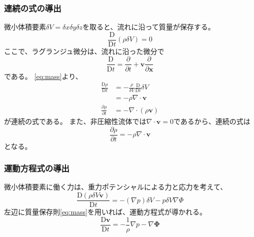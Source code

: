 \documentclass{jsarticle}
\newcommand{\bx}{\mathbf{x}}
\newcommand{\bv}{\mathbf{v}}
\newcommand{\pder}[2][]{\frac{\partial#1}{\partial#2}}
\newcommand{\Dder}[2][]{\frac{\mathrm{D}#1}{\mathrm{D}#2}}
\begin{document}
\subsubsection{連続の式の導出}
微小体積要素$\delta V = \delta x \delta y \delta z$を取ると、流れに沿って質量が保存する。
\begin{equation}
    \Dder[]{t} (\rho\delta V)= 0\label{eq:mass}
\end{equation}
ここで、ラグランジュ微分は、流れに沿った微分で
\begin{equation}
    \Dder[]{t} = \pder[]{t} + \bv\pder[]{\bx}
\end{equation}
である。
\eqref{eq:mass}より、
\begin{align}
    \Dder[\rho]{t} &= -\frac{\rho}{\delta V}\Dder[]{t} \delta V \\
     &= - \rho \nabla \cdot \bv\\
    \pder[\rho]{t} &= -  \nabla \cdot (\rho\bv)\label{eq:continuous}
\end{align}
\label{eq:continuous}が連続の式である。
また、非圧縮性流体では$\nabla \cdot \bv = 0$であるから、連続の式は
\begin{equation}
    \pder[\rho]{t} = -  \rho \nabla \cdot \bv
\end{equation}
となる。
\subsubsection{運動方程式の導出}
微小体積要素に働く力は、重力ポテンシャルによる力と応力を考えて、
\begin{equation}
     \Dder[(\rho \delta V \bv)]{t} = - (\nabla p) \delta V - p \delta V \nabla \Phi
\end{equation}
左辺に質量保存則\eqref{eq:mass}を用いれば、運動方程式が導かれる。
\begin{equation}
    \Dder[\bv]{t} = - \frac{1}{\rho}\nabla p - \nabla\mathbf{\Phi}
\end{equation}
\end{document}
